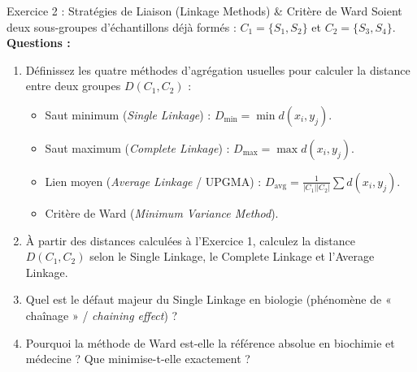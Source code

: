\documentclass[11pt,a4paper]{article}
\begin{document}
\begin{exercicebox}{Exercice 2 : Stratégies de Liaison (Linkage Methods) \& Critère de Ward}
Soient deux sous-groupes d'échantillons déjà formés : $C_1 = \{S_1, S_2\}$ et $C_2 = \{S_3, S_4\}$.
\textbf{Questions :}
\begin{enumerate}[label=\textbf{\alph*.}]
  \item Définissez les quatre méthodes d'agrégation usuelles pour calculer la distance entre deux groupes $D(C_1, C_2)$ :
  \begin{itemize}
    \item Saut minimum (\textit{Single Linkage}) : $D_{\min} = \min d(x_i, y_j)$.
    \item Saut maximum (\textit{Complete Linkage}) : $D_{\max} = \max d(x_i, y_j)$.
    \item Lien moyen (\textit{Average Linkage} / UPGMA) : $D_{\text{avg}} = \frac{1}{|C_1||C_2|} \sum d(x_i, y_j)$.
    \item Critère de Ward (\textit{Minimum Variance Method}).
  \end{itemize}
  \item À partir des distances calculées à l'Exercice 1, calculez la distance $D(C_1, C_2)$ selon le Single Linkage, le Complete Linkage et l'Average Linkage.
  \item Quel est le défaut majeur du Single Linkage en biologie (phénomène de « chaînage » / \textit{chaining effect}) ?
  \item Pourquoi la méthode de Ward est-elle la référence absolue en biochimie et médecine ? Que minimise-t-elle exactement ?
\end{enumerate}
\end{exercicebox}
\end{document}
